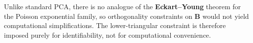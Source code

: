 \documentclass[]{report}
\theoremstyle{definition}
\newtheorem{theorem}{Theorem}
\begin{document}
Unlike standard PCA, there is no analogue of the \textbf{Eckart--Young} theorem for the Poisson exponential family, so orthogonality constraints on $\mathbf{B}$ would not yield computational simplifications. The lower-triangular constraint is therefore imposed purely for identifiability, not for computational convenience.

\end{document}
